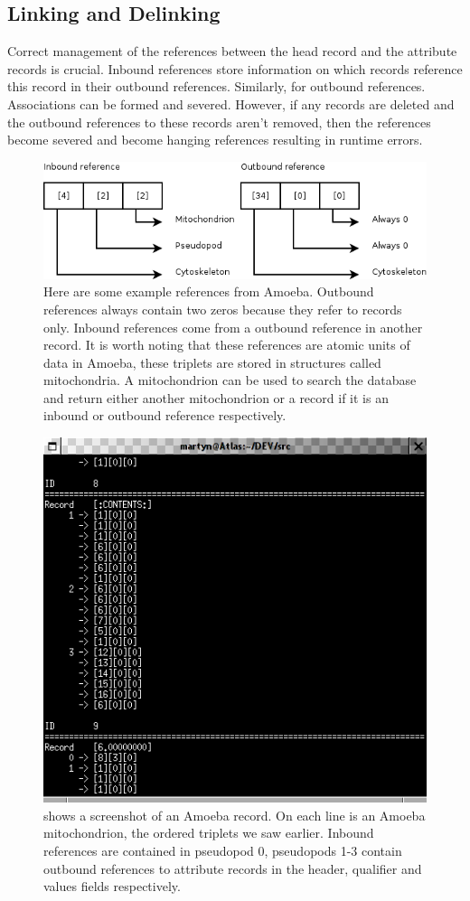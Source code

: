 \documentclass[11pt]{article}
\begin{document}
\subsection{Linking and Delinking}
Correct management of the references between the head record and the attribute records is crucial. Inbound references store information on which records reference this record in their outbound references. Similarly, for outbound references. Associations can be formed and severed. However, if any records are deleted and the outbound references to these records aren't removed, then the references become severed and become hanging references resulting in runtime errors.
\begin{figure}[ht]
\centering
\includegraphics[scale=0.6]{Reference1.png}
\caption{Here are some example references from Amoeba. Outbound references always contain two zeros because they refer to records only. Inbound references come from a outbound reference in another record. It is worth noting that these references are atomic units of data in Amoeba, these triplets are stored in structures called mitochondria. A mitochondrion can be used to search the database and return either another mitochondrion or a record if it is an inbound or outbound reference respectively.}
\end{figure}
\newpage
\noindent
\begin{figure}[ht]
\centering
\includegraphics[scale=1]{Reference2.png}
\caption{shows a screenshot of an Amoeba record. On each line is an Amoeba mitochondrion, the ordered triplets we saw earlier. Inbound references are contained in pseudopod 0, pseudopods 1-3 contain outbound references to attribute records in the header, qualifier and values fields respectively.}
\end{figure}
\end{document}
